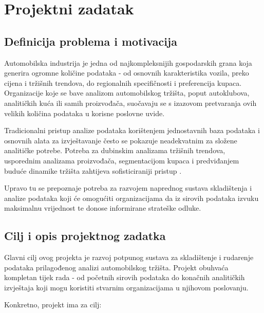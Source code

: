 \section{Projektni zadatak}

\subsection{Definicija problema i motivacija}

Automobilska industrija je jedna od najkompleksnijih gospodarskih grana koja generira ogromne količine podataka - od osnovnih karakteristika vozila, preko cijena i tržišnih trendova, do regionalnih specifičnosti i preferencija kupaca. Organizacije koje se bave analizom automobilskog tržišta, poput autoklubova, analitičkih kuća ili samih proizvođača, suočavaju se s izazovom pretvaranja ovih velikih količina podataka u korisne poslovne uvide.

Tradicionalni pristup analize podataka korištenjem jednostavnih baza podataka i osnovnih alata za izvještavanje često se pokazuje neadekvatnim za složene analitičke potrebe. Potreba za dubinskim analizama tržišnih trendova, usporednim analizama proizvođača, segmentacijom kupaca i predviđanjem buduće dinamike tržišta zahtijeva sofisticiraniji pristup \cite{Silva2021}.

Upravo tu se prepoznaje potreba za razvojem naprednog sustava skladištenja i analize podataka koji će omogućiti organizacijama da iz sirovih podataka izvuku maksimalnu vrijednost te donose informirane strateške odluke.

\subsection{Cilj i opis projektnog zadatka}

Glavni cilj ovog projekta je razvoj potpunog sustava za skladištenje i rudarenje podataka prilagođenog analizi automobilskog tržišta. Projekt obuhvaća kompletan tijek rada - od početnih sirovih podataka do konačnih analitičkih izvještaja koji mogu koristiti stvarnim organizacijama u njihovom poslovanju.

Konkretno, projekt ima za cilj:

